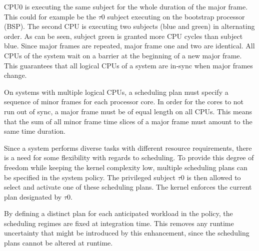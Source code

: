 CPU0 is executing the same subject for the whole duration of the major frame.
This could for example be the $\tau$0 subject executing on the bootstrap
processor (BSP). The second CPU is executing two subjects (blue and green) in
alternating order. As can be seen, subject green is granted more CPU cycles than
subject blue. Since major frames are repeated, major frame one and two are
identical. All CPUs of the system wait on a barrier at the beginning of a new
major frame.  This guarantees that all logical CPUs of a system are in-sync when
major frames change.

On systems with multiple logical CPUs, a scheduling plan must specify a sequence
of minor frames for each processor core. In order for the cores to not run out
of sync, a major frame must be of equal length on all CPUs. This means that the
sum of all minor frame time slices of a major frame must amount to the same time
duration.

Since a system performs diverse tasks with different resource requirements,
there is a need for some flexibility with regards to scheduling. To provide this
degree of freedom while keeping the kernel complexity low, multiple scheduling
plans can be specified in the system policy. The privileged subject $\tau$0 is
then allowed to select and activate one of these scheduling plans. The kernel
enforces the current plan designated by $\tau$0.

By defining a distinct plan for each anticipated workload in the policy, the
scheduling regimes are fixed at integration time. This removes any runtime
uncertainty that might be introduced by this enhancement, since the scheduling
plans cannot be altered at runtime.
